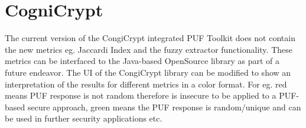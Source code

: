 \section{CogniCrypt}
The current version of the CongiCrypt integrated PUF Toolkit does not contain the new metrics eg. Jaccardi Index and the fuzzy extractor functionality. These metrics can be interfaced to the Java-based OpenSource library as part of a future endeavor. The UI of the CongiCrypt library can be modified to show an interpretation of the results for different metrics in a color format. For eg. red means PUF response is not random therefore is insecure to be applied to a PUF-based secure approach, green means the PUF
response is random/unique and can be used in further security applications etc.\\




